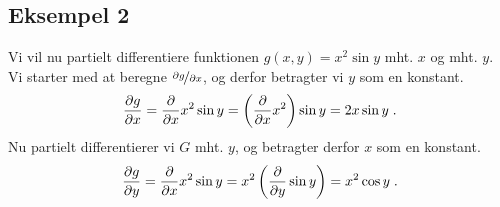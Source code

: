 \subsection{Eksempel 2}
Vi vil nu partielt differentiere funktionen $g(x,y) = x^2 \sin y$
mht. $x$ og mht. $y$. Vi starter med at beregne $\nicefrac{\partial g}{\partial x}$, og
derfor betragter vi $y$ som en konstant.
\[
\pdv{g}{x} = \pdv{}{x} x^2 \sin y
= \left(\pdv{}{x} x^2 \right) \sin y = 2 x \sin y \; .
\]
Nu partielt differentierer vi $G$ mht. $y$, og betragter derfor $x$ som en
konstant.
\[
\pdv{g}{y} = \pdv{}{x} x^2 \sin y
= x^2 \left(\pdv{}{y} \sin y \right) = x^2 \cos y \; .
\]